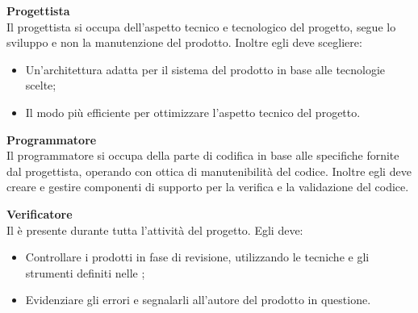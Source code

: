 \mbox{}

\textbf{Progettista}\\
Il progettista si occupa dell'aspetto tecnico e tecnologico del progetto, segue lo sviluppo e non la manutenzione del prodotto. Inoltre egli deve scegliere: 
\begin{itemize}
\item Un'architettura adatta per il sistema del prodotto in base alle tecnologie scelte;
\item Il modo più efficiente per ottimizzare l'aspetto tecnico del progetto.
\end{itemize}

\mbox{}

\textbf{Programmatore}\\
Il programmatore si occupa della parte di codifica in base alle specifiche fornite dal progettista, operando con ottica di manutenibilità del codice. Inoltre egli deve creare e gestire componenti di supporto per la verifica e la validazione del codice. 

\mbox{}

\textbf{Verificatore}\\
Il  è presente durante tutta l'attività del progetto. Egli deve: 
\begin{itemize}
\item Controllare i prodotti in fase di revisione, utilizzando le tecniche e gli strumenti definiti nelle \NdP{}; 
\item Evidenziare gli errori e segnalarli all'autore del prodotto in questione.
\end{itemize}
